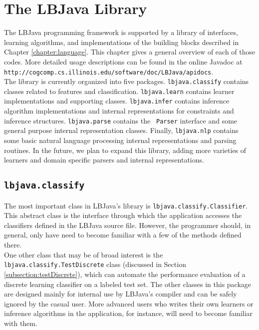 
\chapter{The LBJava Library}

The LBJava programming framework is supported by a library of interfaces,
learning algorithms, and implementations of the building blocks described in
Chapter \ref{chapter:language}.  This chapter gives a general overview of each
of those codes.  More detailed usage descriptions can be found in the online
Javadoc at {\tt http://cogcomp.cs.illinois.edu/software/doc/LBJava/apidocs}. \\

The library is currently organized into five packages.  {\tt lbjava.classify}
contains classes related to features and classification.  {\tt lbjava.learn}
contains learner implementations and supporting classes.  {\tt lbjava.infer}
contains inference algorithm implementations and internal representations for
constraints and inference structures.  {\tt lbjava.parse} contains the {\tt
Parser} interface and some general purpose internal representation classes.
Finally, {\tt lbjava.nlp} contains some basic natural language processing
internal representations and parsing routines.  In the future, we plan to
expand this library, adding more varieties of learners and domain specific
parsers and internal representations.

\section{{\tt lbjava.classify}}

The most important class in LBJava's library is {\tt lbjava.classify.Classifier}.
This abstract class is the interface through which the application accesses
the classifiers defined in the LBJava source file.  However, the programmer
should, in general, only have need to become familiar with a few of the
methods defined there. \\

One other class that may be of broad interest is the {\tt
lbjava.classify.TestDiscrete} class (discussed in Section
\ref{subsection:testDiscrete}), which can automate the performance evaluation
of a discrete learning classifier on a labeled test set.  The other classes in
this package are designed mainly for internal use by LBJava's compiler and can be
safely ignored by the casual user.  More advanced users who writes their own
learners or inference algorithms in the application, for instance, will need
to become familiar with them.

